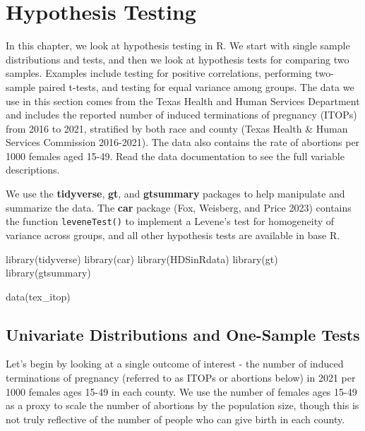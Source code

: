 \documentclass[
  letterpaper,
]{latex/krantz}
\makeatletter
\newenvironment{Shaded}{\begin{snugshade}}{\end{snugshade}}
\newcommand{\FunctionTok}[1]{\textcolor[rgb]{0.28,0.35,0.67}{#1}}
\newcommand{\NormalTok}[1]{\textcolor[rgb]{0.00,0.23,0.31}{#1}}
\newenvironment{kframe}{%
\medskip{}
\setlength{\fboxsep}{.8em}
 \def\at@end@of@kframe{}%
 \ifinner\ifhmode%
  \def\at@end@of@kframe{\end{minipage}}%
  \begin{minipage}{\columnwidth}%
 \fi\fi%
 \def\FrameCommand##1{\hskip\@totalleftmargin \hskip-\fboxsep
 \colorbox{shadecolor}{##1}\hskip-\fboxsep
     \hskip-\linewidth \hskip-\@totalleftmargin \hskip\columnwidth}%
 \MakeFramed {\advance\hsize-\width
   \@totalleftmargin\z@ \linewidth\hsize
   \@setminipage}}%
 {\par\unskip\endMakeFramed%
 \at@end@of@kframe}
\renewenvironment{Shaded}{\begin{kframe}}{\end{kframe}}
\makeatother
\begin{document}
\chapter{Hypothesis Testing}\label{sec-hypothesis-testing}

In this chapter, we look at hypothesis testing
 in R. We start with single sample
distributions and tests, and then we look at hypothesis tests for
comparing two samples. Examples include testing for positive
correlations, performing two-sample paired t-tests, and testing for
equal variance among groups. The data we use in this section comes from
the Texas Health and Human Services Department and includes the reported
number of induced terminations of pregnancy (ITOPs) from 2016 to 2021,
stratified by both race and county (Texas Health \& Human Services
Commission 2016-2021). The data also
contains the rate of abortions per 1000 females aged 15-49. Read the
data documentation to see the full variable descriptions.

We use the \textbf{tidyverse},
\textbf{gt}, and
\textbf{gtsummary} packages to help
manipulate and summarize the data. The \textbf{car}
package (Fox, Weisberg, and Price 2023) contains
the function \texttt{leveneTest()} to implement a Levene's test for
homogeneity of variance across groups, and all other hypothesis tests
are available in base R.

\begin{Shaded}
\begin{Highlighting}[]
\FunctionTok{library}\NormalTok{(tidyverse)}
\FunctionTok{library}\NormalTok{(car)}
\FunctionTok{library}\NormalTok{(HDSinRdata)}
\FunctionTok{library}\NormalTok{(gt)}
\FunctionTok{library}\NormalTok{(gtsummary)}

\FunctionTok{data}\NormalTok{(tex\_itop)}
\end{Highlighting}
\end{Shaded}

\section{\texorpdfstring{Univariate Distributions and One-Sample Tests
}{Univariate Distributions and One-Sample Tests }}\label{univariate-distributions-and-one-sample-tests}

Let's begin by looking at a single outcome of interest - the number of
induced terminations of pregnancy (referred to as ITOPs or abortions
below) in 2021 per 1000 females ages 15-49 in each county. We use the
number of females ages 15-49 as a proxy to scale the number of abortions
by the population size, though this is not truly reflective of the
number of people who can give birth in each county.
\end{document}

